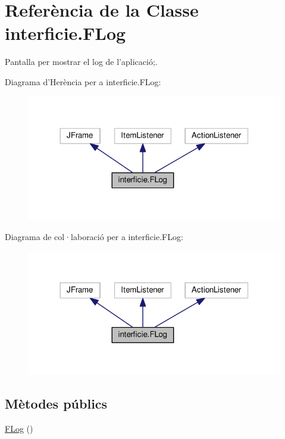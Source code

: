 \hypertarget{classinterficie_1_1_f_log}{\section{Referència de la Classe interficie.\+F\+Log}
\label{classinterficie_1_1_f_log}
}


Pantalla per mostrar el log de l'aplicació;.  




Diagrama d'Herència per a interficie.\+F\+Log\+:\nopagebreak
\begin{figure}[H]
\begin{center}
\leavevmode
\includegraphics[width=317pt]{classinterficie_1_1_f_log__inherit__graph}
\end{center}
\end{figure}


Diagrama de col·laboració per a interficie.\+F\+Log\+:\nopagebreak
\begin{figure}[H]
\begin{center}
\leavevmode
\includegraphics[width=317pt]{classinterficie_1_1_f_log__coll__graph}
\end{center}
\end{figure}
\subsection*{Mètodes públics}
\begin{DoxyCompactItemize}
\item 
\hyperlink{classinterficie_1_1_f_log_ae5adf477dd1e9a2711f855e7505902b2}{F\+Log} ()
\end{DoxyCompactItemize}



